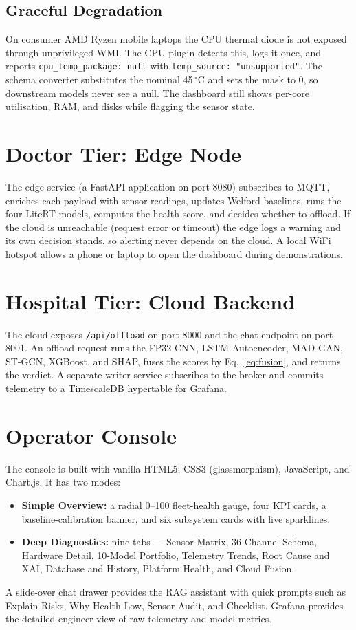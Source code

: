 \documentclass[12pt,a4paper]{report}
\begin{document}
\subsection{Graceful Degradation}
On consumer AMD Ryzen mobile laptops the CPU thermal diode is not exposed through unprivileged WMI. The CPU plugin detects this, logs it once, and reports \texttt{cpu\_temp\_package: null} with \texttt{temp\_source: "unsupported"}. The schema converter substitutes the nominal 45\,$^\circ$C and sets the mask to 0, so downstream models never see a null. The dashboard still shows per-core utilisation, RAM, and disks while flagging the sensor state.

\section{Doctor Tier: Edge Node}
The edge service (a FastAPI application on port 8080) subscribes to MQTT, enriches each payload with sensor readings, updates Welford baselines, runs the four LiteRT models, computes the health score, and decides whether to offload. If the cloud is unreachable (request error or timeout) the edge logs a warning and its own decision stands, so alerting never depends on the cloud. A local WiFi hotspot allows a phone or laptop to open the dashboard during demonstrations.

\section{Hospital Tier: Cloud Backend}
The cloud exposes \texttt{/api/offload} on port 8000 and the chat endpoint on port 8001. An offload request runs the FP32 CNN, LSTM-Autoencoder, MAD-GAN, ST-GCN, XGBoost, and SHAP, fuses the scores by Eq.~\ref{eq:fusion}, and returns the verdict. A separate writer service subscribes to the broker and commits telemetry to a TimescaleDB hypertable for Grafana.

\section{Operator Console}
The console is built with vanilla HTML5, CSS3 (glassmorphism), JavaScript, and Chart.js. It has two modes:
\begin{itemize}
  \item \textbf{Simple Overview:} a radial 0--100 fleet-health gauge, four KPI cards, a baseline-calibration banner, and six subsystem cards with live sparklines.
  \item \textbf{Deep Diagnostics:} nine tabs --- Sensor Matrix, 36-Channel Schema, Hardware Detail, 10-Model Portfolio, Telemetry Trends, Root Cause and XAI, Database and History, Platform Health, and Cloud Fusion.
\end{itemize}
A slide-over chat drawer provides the RAG assistant with quick prompts such as Explain Risks, Why Health Low, Sensor Audit, and Checklist. Grafana provides the detailed engineer view of raw telemetry and model metrics.
\end{document}
